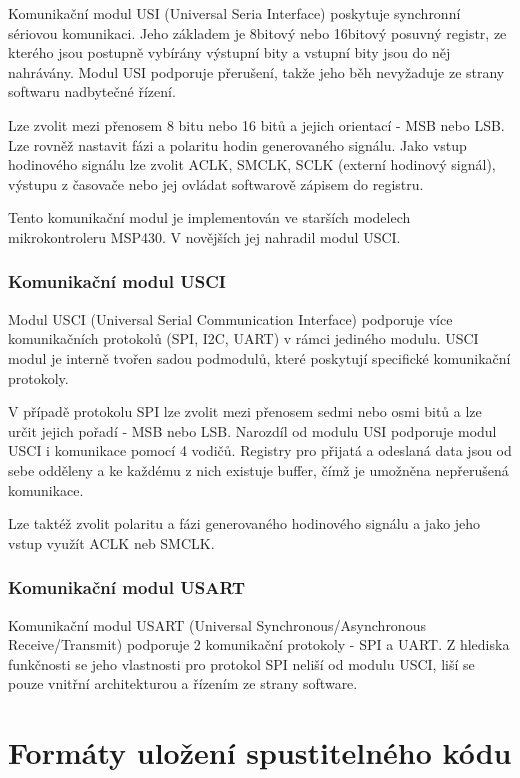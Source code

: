 Komunikační modul USI (Universal Seria Interface) poskytuje synchronní sériovou komunikaci. Jeho základem je 8bitový nebo 16bitový posuvný registr, ze kterého jsou postupně vybírány výstupní bity a vstupní bity jsou do něj nahrávány. Modul USI podporuje přerušení, takže jeho běh nevyžaduje ze strany softwaru nadbytečné řízení.

Lze zvolit mezi přenosem 8 bitu nebo 16 bitů a jejich orientací - MSB nebo LSB. Lze rovněž nastavit fázi a polaritu hodin generovaného signálu. Jako vstup hodinového signálu lze zvolit ACLK, SMCLK, SCLK (externí hodinový signál), výstupu z časovače nebo jej ovládat softwarově zápisem do registru.

Tento komunikační modul je implementován ve starších modelech mikrokontroleru MSP430. V novějších jej nahradil modul USCI.

\subsubsection{Komunikační modul USCI}

Modul USCI (Universal Serial Communication Interface) podporuje více komunikačních protokolů (SPI, I2C, UART) v rámci jediného modulu. USCI modul je interně tvořen sadou podmodulů, které poskytují specifické komunikační protokoly.

V případě protokolu SPI lze zvolit mezi přenosem sedmi nebo osmi bitů a lze určit jejich pořadí - MSB nebo LSB. Narozdíl od modulu USI podporuje modul USCI i komunikace pomocí 4 vodičů. Registry pro přijatá a odeslaná data jsou od sebe odděleny a ke každému z nich existuje buffer, čímž je umožněna nepřerušená komunikace.

Lze taktéž zvolit polaritu a fázi generovaného hodinového signálu a jako jeho vstup využít ACLK neb SMCLK.

\subsubsection{Komunikační modul USART}

Komunikační modul USART (Universal Synchronous/Asynchronous Receive/Transmit) podporuje 2 komunikační protokoly - SPI a UART. Z hlediska funkčnosti se jeho vlastnosti pro protokol SPI neliší od modulu USCI, liší se pouze vnitřní architekturou a řízením ze strany software.


\section{Formáty uložení spustitelného kódu}

